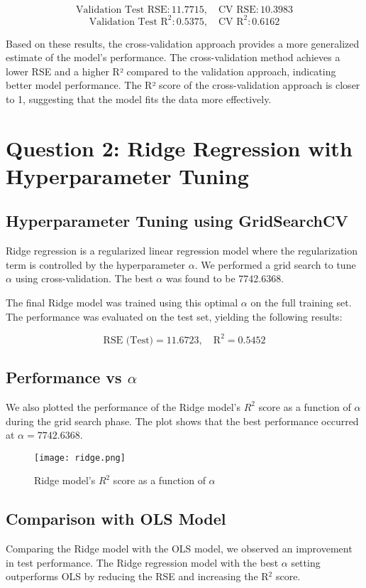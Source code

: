 \documentclass[a4paper,12pt]{article}
\begin{document}
\[
\text{Validation Test RSE}: 11.7715, \quad \text{CV RSE}: 10.3983
\]
\[
\text{Validation Test R}^2: 0.5375, \quad \text{CV R}^2: 0.6162
\]

Based on these results, the cross-validation approach provides a more generalized estimate of the model's performance. The cross-validation method achieves a lower RSE and a higher R² compared to the validation approach, indicating better model performance. The R² score of the cross-validation approach is closer to 1, suggesting that the model fits the data more effectively. 

\section*{Question 2: Ridge Regression with Hyperparameter Tuning}

\subsection*{Hyperparameter Tuning using GridSearchCV}
Ridge regression is a regularized linear regression model where the regularization term is controlled by the hyperparameter \(\alpha\). We performed a grid search to tune \(\alpha\) using cross-validation. The best \(\alpha\) was found to be 7742.6368.

The final Ridge model was trained using this optimal \(\alpha\) on the full training set. The performance was evaluated on the test set, yielding the following results:

\[
\text{RSE (Test)} = 11.6723, \quad \text{R}^2 = 0.5452
\]

\subsection*{Performance vs \(\alpha\)}
We also plotted the performance of the Ridge model's $R^2$ score as a function of \(\alpha\) during the grid search phase. The plot shows that the best performance occurred at \(\alpha = 7742.6368\).
\begin{figure}[H]
    \centering
    \texttt{[image: ridge.png]}
    \caption{Ridge model's $R^2$ score as a function of \(\alpha\)}
    \label{fig:enter-label}
\end{figure}


\subsection*{Comparison with OLS Model}
Comparing the Ridge model with the OLS model, we observed an improvement in test performance. The Ridge regression model with the best \(\alpha\) setting outperforms OLS by reducing the RSE and increasing the R\(^2\) score.
\end{document}
